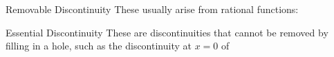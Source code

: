 \documentclass[Lecture.tex]{subfiles}
\begin{document}
\begin{frame}{Removable Discontinuity}
  These usually arise from rational functions:
  \begin{multicols}{2}
    \columnbreak
  \end{multicols}
\end{frame}

\begin{frame}{Essential Discontinuity}
  These are discontinuities that cannot be removed by filling in a hole, such as the discontinuity at $x = 0$ of 
  \begin{multicols}{2}
    \columnbreak
  \end{multicols}
\end{frame}
\end{document}
